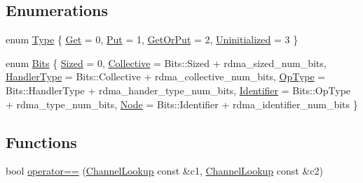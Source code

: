 \subsection*{Enumerations}
\begin{DoxyCompactItemize}
\item 
enum \hyperlink{namespacevt_1_1rdma_ac848e1d9da43db6294bd06f83e5d3946}{Type} \{ \hyperlink{namespacevt_1_1rdma_ac848e1d9da43db6294bd06f83e5d3946a7653269c41530935491b853a60a28488}{Get} = 0, 
\hyperlink{namespacevt_1_1rdma_ac848e1d9da43db6294bd06f83e5d3946a6cc12e3b6374ba01b98266a39056f047}{Put} = 1, 
\hyperlink{namespacevt_1_1rdma_ac848e1d9da43db6294bd06f83e5d3946aa0501b4d324033d770edd9602d70ac20}{Get\+Or\+Put} = 2, 
\hyperlink{namespacevt_1_1rdma_ac848e1d9da43db6294bd06f83e5d3946ad38b2f4330d80d2bef85002c63ad3f10}{Uninitialized} = 3
 \}
\item 
enum \hyperlink{namespacevt_1_1rdma_a91e7211515508952960ca446ea609f65}{Bits} \{ \newline
\hyperlink{namespacevt_1_1rdma_a91e7211515508952960ca446ea609f65a019f37aff813cc26a5405852479c4492}{Sized} = 0, 
\hyperlink{namespacevt_1_1rdma_a91e7211515508952960ca446ea609f65a0c46028604cc9666bc7b90ebfc93906a}{Collective} = Bits\+:\+:Sized + rdma\+\_\+sized\+\_\+num\+\_\+bits, 
\hyperlink{namespacevt_1_1rdma_a91e7211515508952960ca446ea609f65a01dc72467751076ef772522e41d03f85}{Handler\+Type} = Bits\+:\+:Collective + rdma\+\_\+collective\+\_\+num\+\_\+bits, 
\hyperlink{namespacevt_1_1rdma_a91e7211515508952960ca446ea609f65aa9d5f87215abca8a8a3632e850199ee8}{Op\+Type} = Bits\+:\+:Handler\+Type + rdma\+\_\+hander\+\_\+type\+\_\+num\+\_\+bits, 
\newline
\hyperlink{namespacevt_1_1rdma_a91e7211515508952960ca446ea609f65af80d8cb1a0c78b2c52fa1e5681e77cf6}{Identifier} = Bits\+:\+:Op\+Type + rdma\+\_\+type\+\_\+num\+\_\+bits, 
\hyperlink{namespacevt_1_1rdma_a91e7211515508952960ca446ea609f65a5617d7b6da2c56e54f5d9c126502fd04}{Node} = Bits\+:\+:Identifier + rdma\+\_\+identifier\+\_\+num\+\_\+bits
 \}
\end{DoxyCompactItemize}
\subsection*{Functions}
\begin{DoxyCompactItemize}
\item 
bool \hyperlink{namespacevt_1_1rdma_a176cd995a0222c9fef4030d3ac0ed08e}{operator==} (\hyperlink{structvt_1_1rdma_1_1_channel_lookup}{Channel\+Lookup} const \&c1, \hyperlink{structvt_1_1rdma_1_1_channel_lookup}{Channel\+Lookup} const \&c2)
\end{DoxyCompactItemize}
